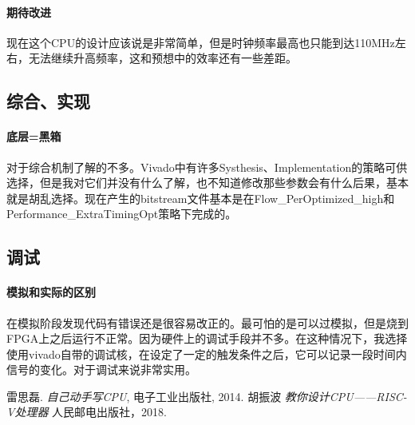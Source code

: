 \documentclass[UTF8]{ctexart}
\begin{document}
		
		\paragraph{期待改进} 现在这个CPU的设计应该说是非常简单，但是时钟频率最高也只能到达110MHz左右，无法继续升高频率，这和预想中的效率还有一些差距。
	\subsection{综合、实现}
		\paragraph{底层=黑箱} 对于综合机制了解的不多。Vivado中有许多Systhesis、Implementation的策略可供选择，但是我对它们并没有什么了解，也不知道修改那些参数会有什么后果，基本就是胡乱选择。现在产生的bitstream文件基本是在Flow\_PerOptimized\_high和Performance\_ExtraTimingOpt策略下完成的。
	\subsection{调试}
		\paragraph{模拟和实际的区别} 在模拟阶段发现代码有错误还是很容易改正的。最可怕的是可以过模拟，但是烧到FPGA上之后运行不正常。因为硬件上的调试手段并不多。在这种情况下，我选择使用vivado自带的调试核，在设定了一定的触发条件之后，它可以记录一段时间内信号的变化。对于调试来说非常实用。
		
	\begin{thebibliography}{9}
		雷思磊.
		\emph{自己动手写CPU},
		电子工业出版社, 2014.
		胡振波
		\emph{教你设计CPU——RISC-V处理器}
		人民邮电出版社，2018.
	\end{thebibliography}
	
\end{document}
